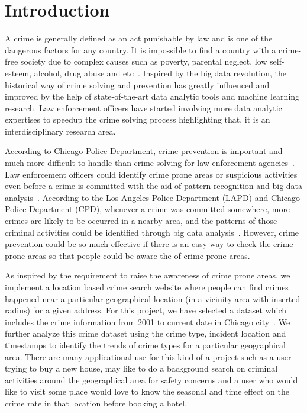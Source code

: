 \section{Introduction}

A crime is generally defined as an act punishable by law and is one of
the dangerous factors for any
country\cite{hid-sp18-409-agarwal2013crime}. It is impossible to find
a country with a crime- free society due to complex causes such as
poverty, parental neglect, low self-esteem, alcohol, drug abuse and
etc~\cite{hid-sp18-409-bharathi2014survey,
hid-sp18-409-kiani2015analysis}.  Inspired by the big data revolution,
the historical way of crime solving and prevention has greatly
influenced and improved by the help of state-of-the-art data analytic
tools and machine learning research. Law enforcement officers have
started involving more data analytic expertises to speedup the crime
solving process highlighting that, it is an interdisciplinary research
area.

According to Chicago Police Department, crime prevention is important
and much more difficult to handle than crime solving for law
enforcement agencies~\cite{hid-sp18-409-www-cpd}. Law enforcement
officers could identify crime prone areas or suspicious activities
even before a crime is committed with the aid of pattern recognition
and big data analysis~\cite{hid-sp18-409-nath2006crime,
hid-sp18-409-gera2014city}.  According to the Los Angeles Police
Department (LAPD) and Chicago Police Department (CPD), whenever a
crime was committed somewhere, more crimes are likely to be occurred
in a nearby area, and the patterns of those criminal activities could
be identified through big data analysis~\cite{hid-sp18-409-www-cpd,
hid-sp18-409-www-lapd}. However, crime prevention could be so much
effective if there is an easy way to check the crime prone areas so
that people could be aware the of crime prone areas.

As inspired by the requirement to raise the awareness of crime prone
areas, we implement a location based crime search website where people
can find crimes happened near a particular geographical location (in a
vicinity area with inserted radius) for a given address. For this
project, we have selected a dataset which includes the crime
information from 2001 to current date in Chicago
city~\cite{hid-sp18-409-www-data.gov}. We further analyze this crime
dataset using the crime type, incident location and timestamps to
identify the trends of crime types for a particular geographical
area. There are many applicational use for this kind of a project such
as a user trying to buy a new house, may like to do a background
search on criminal activities around the geographical area for safety
concerns and a user who would like to visit some place would love to
know the seasonal and time effect on the crime rate in that location
before booking a hotel.

